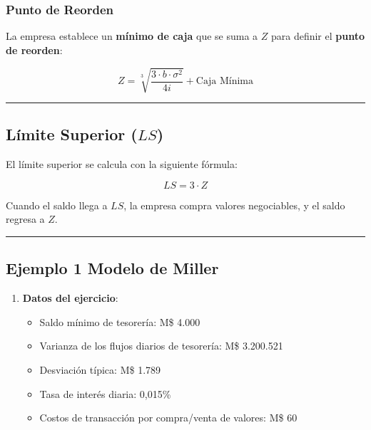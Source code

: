 \documentclass[
  letterpaper,
  DIV=11,
  numbers=noendperiod]{scrartcl}
\providecommand{\tightlist}{%
  \setlength{\itemsep}{0pt}\setlength{\parskip}{0pt}}\usepackage{longtable,booktabs,array}
\begin{document}
\subsubsection{Punto de Reorden}\label{punto-de-reorden}

La empresa establece un \textbf{mínimo de caja} que se suma a \(Z\) para
definir el \textbf{punto de reorden}:

\[ 
Z = \sqrt[3]{\frac{3 \cdot b \cdot \sigma^2}{4i}} + \text{Caja Mínima}
\]

\begin{center}\rule{0.5\linewidth}{0.5pt}\end{center}

\subsection{\texorpdfstring{Límite Superior
(\(LS\))}{Límite Superior (LS)}}\label{luxedmite-superior-ls}

El límite superior se calcula con la siguiente fórmula:

\[ 
LS = 3 \cdot Z 
\]

Cuando el saldo llega a \(LS\), la empresa compra valores negociables, y
el saldo regresa a \(Z\).

\begin{center}\rule{0.5\linewidth}{0.5pt}\end{center}

\subsection{Ejemplo 1 Modelo de
Miller}\label{ejemplo-1-modelo-de-miller}

\begin{enumerate}
\def\labelenumi{\arabic{enumi}.}
\tightlist
\item
  \textbf{Datos del ejercicio}:

  \begin{itemize}
  \tightlist
  \item
    Saldo mínimo de tesorería: M\$ 4.000
  \item
    Varianza de los flujos diarios de tesorería: M\$ 3.200.521
  \item
    Desviación típica: M\$ 1.789
  \item
    Tasa de interés diaria: 0,015\%
  \item
    Costos de transacción por compra/venta de valores: M\$ 60
  \end{itemize}
\end{enumerate}
\end{document}
